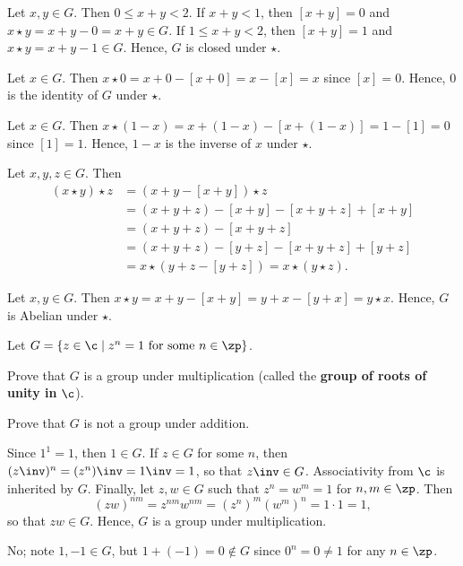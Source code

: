 \begin{solitem}
    \item Let $x, y \in G$. Then $0 \leq x + y < 2$. If $x + y < 1$, then $[x + y] = 0$ and $x \star y = x + y - 0 = x + y \in G$. If $1 \leq x + y < 2$, then $[x + y] = 1$ and $x \star y = x + y - 1 \in G$. Hence, $G$ is closed under $\star$.
    \item Let $x \in G$. Then $x \star 0 = x + 0 - [x + 0] = x - [x] = x$ since $[x] = 0$. Hence, $0$ is the identity of $G$ under $\star$.
    \item Let $x \in G$. Then $x \star (1 - x) = x + (1 - x) - [x + (1 - x)] = 1 - [1] = 0$ since $[1] = 1$. Hence, $1 - x$ is the inverse of $x$ under $\star$.
    \item Let $x, y, z \in G$. Then
    \begin{align*}
        (x \star y) \star z & = (x + y - [x + y]) \star z \\
        & = (x + y + z) - [x + y] - [x + y + z] + [x + y] \\
        & = (x + y + z) - [x + y + z] \\
        & = (x + y + z) - [y + z] - [x + y + z] + [y + z] \\
        & = x \star (y + z - [y + z]) = x \star (y \star z).
    \end{align*}
    \item Let $x, y \in G$. Then $x \star y = x + y - [x + y] = y + x - [y + x] = y \star x$. Hence, $G$ is Abelian under $\star$.
\end{solitem}

\begin{exercise}\label{ex1.1.8}
    Let $G = \{z \in \c \mid z^n = 1 \text{ for some } n \in \zp \}$.
    \begin{subproblems}
        \item Prove that $G$ is a group under multiplication (called the \textbf{group of roots of unity in} $\c$).
        \item Prove that $G$ is not a group under addition.
    \end{subproblems}
\end{exercise}

\begin{solalph}
    \item Since $1^1 = 1$, then $1 \in G$. If $z \in G$ for some $n$, then $(z\inv)^n = (z^n)\inv = 1\inv = 1$, so that $z\inv \in G$. Associativity from $\c$ is inherited by $G$. Finally, let $z, w \in G$ such that $z^n = w^m = 1$ for $n, m \in \zp$. Then
    \[(zw)^{nm} = z^{nm} w^{nm} = (z^n)^m (w^m)^n = 1 \cdot 1 = 1,\]
    so that $zw \in G$. Hence, $G$ is a group under multiplication.
    \item No; note $1, -1 \in G$, but $1 + (-1) = 0 \not\in G$ since $0^n = 0 \neq 1$ for any $n \in \zp$.
\end{solalph}

